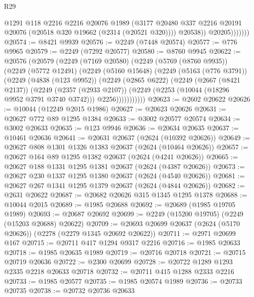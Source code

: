 \begin{lexlean}{R29}
\begin{coremodule}
                      @1291
                      @118
                      @2216
                      @2216
                      @20076
                      @1989
                      (@3177
                        @20480
                        @337
                        @2216
                        @20191
                        @20076
                        (@20518 @320 @19662 (@2314 (@20521 @320))))
                      @20538))
                  @20205)))))))
@20574 := @8421 @9939
@20576 := @2249 (@7448 @20574)
@20577 := @776 @9965
@20579 := @2249 (@7292 @20577)
@20580 := @8760 @9945
@20622 := @20576
    (@20579
      (@2249
        (@7169 @20580)
        (@2249
          (@5769 (@8760 @9935))
          (@2249
            (@5772 @12491)
            (@2249
              (@5160 @15648)
              (@2249
                (@5163 (@776 @3791))
                (@2249
                  (@4838 (@123 @9952))
                  (@2249
                    (@2865 @6222)
                    (@2249
                      (@2667 (@8421 @2137))
                      (@2249
                        (@2357 (@2933 @2107))
                        (@2249 (@2253 (@10044 (@18296 @9952 @3791 @3740 @3742))) @2256)))))))))))
@20623 := @2602 @20622
@20626 := @10044 (@12249 @2015 @1986)
@20627 := @20623 @20626
@20631 := @20627 @772 @89 @1295 @1384
@20633 := @3002 @20577 @20574
@20634 := @3002 @20633
@20635 := @123 @9946
@20636 := @20634 @20635
@20637 := @10461 @20636
@20641 := @20631 @20637 (@2624 (@10392 @20626))
@20649 := @20627 @808 @1301 @1326 @1383 @20637 (@2624 (@10464 @20626))
@20657 := @20627 @164 @89 @1295 @1382 @20637 (@2624 (@4241 @20626))
@20665 := @20627 @188 @1331 @1295 @1381 @20637 (@2624 (@4387 @20626))
@20673 := @20627 @230 @1337 @1295 @1380 @20637 (@2624 (@4540 @20626))
@20681 := @20627 @267 @1341 @1295 @1379 @20637 (@2624 (@4844 @20626))
@20682 := @2631 @20622
@20687 := @20682 @20626 @315 @1345 @1295 @1378
@20688 := @10044 @2015
@20689 := @1985 @20688
@20692 := @20689 (@1985 @19705 @1989)
@20693 := @20687 @20692
@20699 := @2249 (@15200 @19705) (@2249 (@15203 @20688) @20622)
@20709 := @20693 @20699 @20637 (@2624 (@5170 @20626)) (@2278 (@2279 @1345 @20692 @20622))
@20711 := @2971 @20699 @167
@20715 := @20711 @417 @1294 @9317 @2216
@20716 := @1985 @20633
@20718 := @1985 @20635 @1989
@20719 := @20716 @20718
@20721 := @20715 @20719 @20636
@20722 := @2300 @20699
@20728 := @20722 @1289 @1293 @2335 @2218 @20633 @20718
@20732 := @20711 @415 @1288 @2333 @2216
@20733 := @1985 @20577
@20735 := @1985 @20574 @1989
@20736 := @20733 @20735
@20738 := @20732 @20736 @20633

\end{coremodule}
\end{lexlean}
